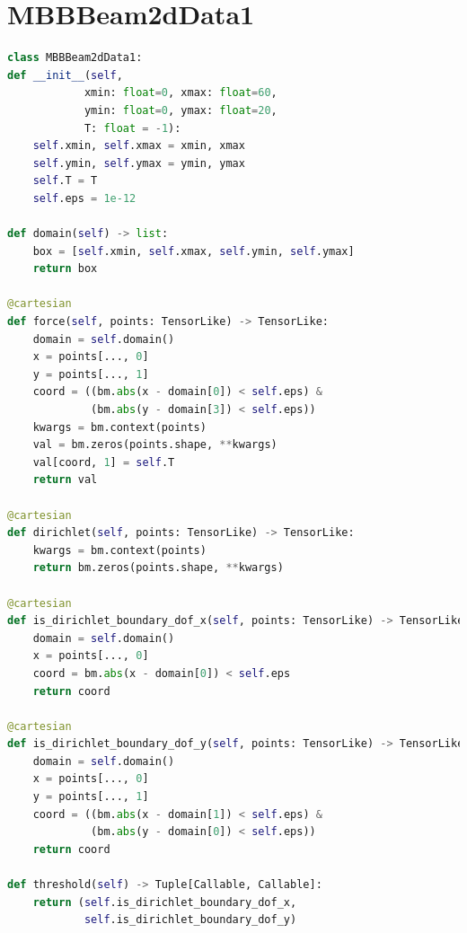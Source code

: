 \documentclass[mathpazo]{cicp}
\begin{document}
\section{MBBBeam2dData1}
\label{sec:code_mbb}
\begin{lstlisting}[language=python]
class MBBBeam2dData1:
def __init__(self, 
			xmin: float=0, xmax: float=60, 
			ymin: float=0, ymax: float=20,
			T: float = -1):
	self.xmin, self.xmax = xmin, xmax
	self.ymin, self.ymax = ymin, ymax
	self.T = T
	self.eps = 1e-12

def domain(self) -> list:
	box = [self.xmin, self.xmax, self.ymin, self.ymax]
	return box

@cartesian
def force(self, points: TensorLike) -> TensorLike:
	domain = self.domain()
	x = points[..., 0]
	y = points[..., 1]
	coord = ((bm.abs(x - domain[0]) < self.eps) & 
			 (bm.abs(y - domain[3]) < self.eps))
	kwargs = bm.context(points)
	val = bm.zeros(points.shape, **kwargs)
	val[coord, 1] = self.T
	return val

@cartesian
def dirichlet(self, points: TensorLike) -> TensorLike:
	kwargs = bm.context(points)
	return bm.zeros(points.shape, **kwargs)

@cartesian
def is_dirichlet_boundary_dof_x(self, points: TensorLike) -> TensorLike:
	domain = self.domain()
	x = points[..., 0]
	coord = bm.abs(x - domain[0]) < self.eps
	return coord

@cartesian
def is_dirichlet_boundary_dof_y(self, points: TensorLike) -> TensorLike:
	domain = self.domain()
	x = points[..., 0]
	y = points[..., 1]
	coord = ((bm.abs(x - domain[1]) < self.eps) &
			 (bm.abs(y - domain[0]) < self.eps))
	return coord

def threshold(self) -> Tuple[Callable, Callable]:
	return (self.is_dirichlet_boundary_dof_x, 
			self.is_dirichlet_boundary_dof_y)
\end{lstlisting}
\end{document}
